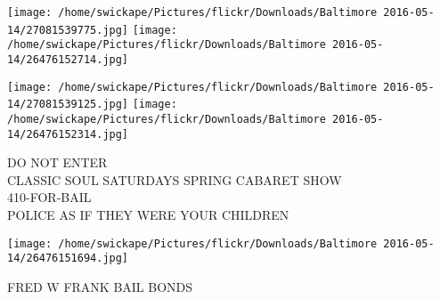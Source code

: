 \documentclass[10pt,letterpaper]{article}
\begin{document}
\texttt{[image: /home/swickape/Pictures/flickr/Downloads/Baltimore 2016-05-14/27081539775.jpg]}
\texttt{[image: /home/swickape/Pictures/flickr/Downloads/Baltimore 2016-05-14/26476152714.jpg]}

\texttt{[image: /home/swickape/Pictures/flickr/Downloads/Baltimore 2016-05-14/27081539125.jpg]}
\texttt{[image: /home/swickape/Pictures/flickr/Downloads/Baltimore 2016-05-14/26476152314.jpg]}

DO NOT ENTER\\
CLASSIC SOUL SATURDAYS SPRING CABARET SHOW\\
410{-}FOR{-}BAIL\\
POLICE AS IF THEY WERE YOUR CHILDREN\\
\pagebreak

\texttt{[image: /home/swickape/Pictures/flickr/Downloads/Baltimore 2016-05-14/26476151694.jpg]}

FRED W FRANK BAIL BONDS\\
\pagebreak
\end{document}
